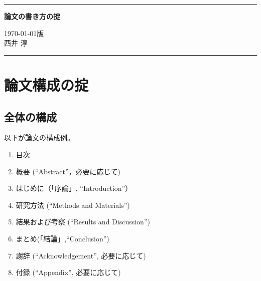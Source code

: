 \documentclass[12pt, ]{jsarticle}
\providecommand{\tightlist}{%
   \setlength{\itemsep}{0pt}\setlength{\parskip}{0pt}}
\begin{document}
\renewcommand{\lstlistingname}{リスト}


\pagestyle{empty}
\rule{\linewidth}{0.3pt}
\begin{center}
  \textbf{\LARGE 論文の書き方の掟}
\end{center}
\begin{flushright}
\today 版\\
西井 淳
\end{flushright}
\rule{\linewidth}{0.3pt}
{\small
\begin{quote}
\begin{screen}
\tableofcontents
\end{screen}\vspace{3mm}
\end{quote}}


\newpage
\pagestyle{fancy}
\section{論文構成の掟}\label{ux8ad6ux6587ux69cbux6210ux306eux639f}

\subsection{全体の構成}\label{ux5168ux4f53ux306eux69cbux6210}

以下が論文の構成例。

\begin{enumerate}
\tightlist
\item
  目次
\item
  概要 (``Abstract''，必要に応じて)
\item
  はじめに（「序論」, ``Introduction''）
\item
  研究方法 (``Methods and Materials'')
\item
  結果および考察 (``Results and Discussion'')
\item
  まとめ(「結論」,``Conclusion'')
\item
  謝辞 (``Acknowledgement'', 必要に応じて)
\item
  付録 (``Appendix'', 必要に応じて)
\end{enumerate}
\end{document}
